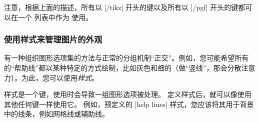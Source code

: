 \begin{command}{\tikzset{}}

    注意，根据上面的描述，所有以 |/tikz| 开头的键以及所有以 |/pgf| 开头的键都可以在一个  列表中作为  使用。
\end{command}


\subsubsection{使用样式来管理图片的外观}


有一种组织图形选项集的方法与正常的分组机制``正交''。例如，您可能希望所有的``帮助线''都以某种特定的方式绘制，比如灰色和细的（做``竖线''，那会分散注意力）。为此，您可以使用\emph{样式}。


样式是一个键，使用时会导致一组图形选项被处理。 定义样式后，就可以像使用其他任何键一样使用它。 例如，预定义的 |help lines| 样式，您应该将其用于背景中的线条，例如网格线或辅助线。
%
\begin{codeexample}[]
\end{codeexample}



